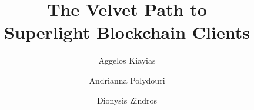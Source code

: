 \title{The Velvet Path to\\Superlight Blockchain Clients}
\ifanonymous{\iflncs
\author{}\institute{}
\fi}
\else
\author{
        Aggelos Kiayias \and
        Andrianna Polydouri \and
        Dionysis Zindros
}
\fi

\iflncs
\maketitle

\fi
